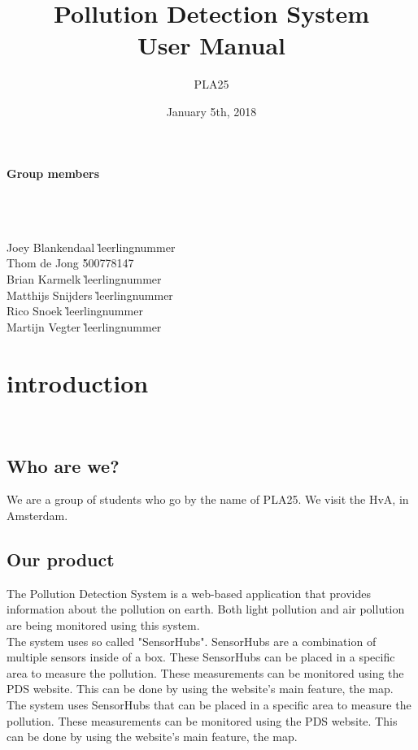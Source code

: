 \documentclass[a4paper]{article}
\title{Pollution Detection System\\User Manual}
\author{PLA25}
\date{January 5th, 2018}
\begin{document}
\clearpage
\maketitle
\vspace*{\fill}
\paragraph{Group members}
~\\\\
\begin{tabbing}
Joey Blankendaal \` leerlingnummer
\\
Thom de Jong \` 500778147
\\
Brian Karmelk \` leerlingnummer
\\
Matthijs Snijders \` leerlingnummer
\\
Rico Snoek \` leerlingnummer
\\
Martijn Vegter \` leerlingnummer
\end{tabbing}
\thispagestyle{empty}
\setcounter{page}{0}
\pagebreak
\tableofcontents
\pagebreak

\section{introduction}
~\\

\subsection{Who are we?}
We are a group of students who go by the name of PLA25. We visit the HvA, in Amsterdam.
~\\

\subsection{Our product}
The Pollution Detection System is a web-based application that provides information about the pollution on earth. Both light pollution and air pollution are being monitored using this system.
\\
The system uses so called "SensorHubs". SensorHubs are a combination of multiple sensors inside of a box. These SensorHubs can be placed in a specific area to measure the pollution. These measurements can be monitored using the PDS website. This can be done by using the website's main feature, the map.
\\
The system uses SensorHubs that can be placed in a specific area to measure the pollution. These measurements can be monitored using the PDS website. This can be done by using the website's main feature, the map.
\end{document}
